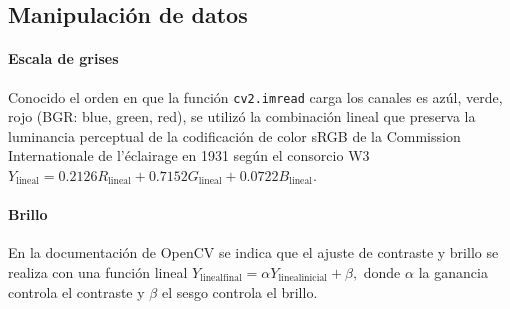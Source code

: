 \documentclass{article}
\begin{document}




\subsection{Manipulación de datos}

\paragraph{Escala de grises}
Conocido el orden en que la función \verb'cv2.imread' carga los canales es azúl, verde, rojo (BGR: blue, green, red), se utilizó la combinación lineal que preserva la luminancia perceptual de la codificación de color sRGB de la Commission Internationale de l'éclairage en 1931 según el consorcio W3 \cite{noauthor_standard_1996} $
Y_\mathrm{lineal} = 0.2126 R_\mathrm{lineal} + 0.7152 G_\mathrm{lineal} + 0.0722 B_\mathrm{lineal} .
$

\paragraph{Brillo}
En la documentación de OpenCV se indica que el ajuste de contraste y brillo se realiza con una función lineal \cite{noauthor_opencv_nodate}
$
Y_\mathrm{lineal final} = \alpha Y_\mathrm{lineal inicial} + \beta ,
$
donde $\alpha$ la ganancia controla el contraste y $\beta$ el sesgo controla el brillo.





\end{document}
